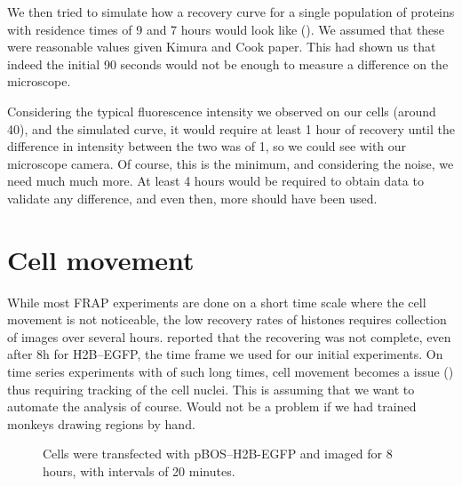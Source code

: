   We then tried to simulate how a recovery curve for a single population of proteins with
  residence times of 9 and 7 hours would look like (). We assumed
  that these were reasonable values given Kimura and Cook paper. This had shown us that indeed
  the initial 90 seconds would not be enough to measure a difference on the microscope.
  
  \begin{figure}
    \centering
                 {}
    \label{fig:simulated-frap}
  \end{figure}
  
  Considering the typical fluorescence intensity we observed on our cells (around 40), and the simulated curve,
  it would require at least 1 hour of recovery until the difference in intensity between the two was of 1, so
  we could see with our microscope camera. Of course, this is the minimum, and considering the noise, we need
  much much more. At least 4 hours would be required to obtain data to validate any difference, and even then,
  more should have been used.

\section{Cell movement}

  While most FRAP experiments are done on a short time scale where the cell movement
  is not noticeable, the low recovery rates of histones requires collection of images
  over several hours.  reported that the recovering was not
  complete, even after 8h for H2B--EGFP, the time frame we used for our initial experiments.
  On time series experiments with of such long
  times, cell movement becomes a issue () thus requiring tracking
  of the cell nuclei. This is assuming that we want to automate the analysis of course.
  Would not be a problem if we had trained monkeys drawing regions by hand.
  
  \begin{figure}
    \centering
                 {Cells were transfected with pBOS--H2B-EGFP and imaged for 8
                  hours, with intervals of 20 minutes.}
    \label{fig:cell-movement}
  \end{figure}
  
